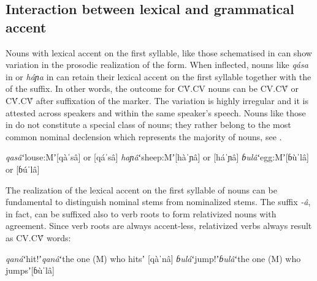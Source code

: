 \documentclass[output=paper]{LSP/langsci}
\begin{document}
\subsection{Interaction between lexical and grammatical accent} \label{sec:Petrollino:interaction}

Nouns with lexical accent on the first syllable, like those schematised in  can show variation in the prosodic realization of the  form. When inflected, nouns like \textit{qása} in  or \textit{háɲa} in  can retain their lexical accent on the first syllable together with the  of the  suffix. In other words, the outcome for CV́.CV nouns can be CV.CV̂ or CV́.CV̂ after suffixation of the   marker. The variation is highly irregular and it is attested across speakers and within the same speaker's speech. Nouns like those in  do not constitute a special class of nouns; they rather belong to the most common nominal declension which represents the majority of  nouns, see \citet[74]{Petrollino2016}. 
\begin{exe}
\ex \label{ex:Petrollino:irregular}\begin{xlist}
\ex \textit{qasâ}\hspace{16mm}ʻlouse:Mʼ\hspace{10mm}[qàˈsâ] or [qáˈsâ]
\ex \textit{haɲâ}\hspace{16mm}ʻsheep:Mʼ\hspace{9mm}[hàˈɲâ] or [háˈɲâ]
\ex \textit{ɓulâ}\hspace{17mm}ʻegg:Mʼ\hspace{13mm}[ɓùˈlâ] or [ɓúˈlâ]
\end{xlist}
\end{exe}
The realization of the lexical accent on the first syllable of  nouns can be fundamental to distinguish nominal stems from nominalized stems. The  suffix \textit{-â}, in fact, can be suffixed also to verb roots to form relativized nouns with  agreement. Since verb roots are always accent-less,  relativized verbs always result as CV.CV̂ words:
\begin{exe}
\ex \label{ex:Petrollino:relativized verbs} \begin{xlist}
\ex \textit{qaná}\hspace{15mm}ʻhit!ʼ\hspace{8mm}\textit{qanâ}\hspace{8mm}ʻthe one (M) who hitsʼ\hspace{5mm} [qàˈnâ]
\ex \textit{ɓulá}\hspace{16mm}ʻjump!ʼ\hspace{4mm}\textit{ɓulâ}\hspace{9mm}ʻthe one (M) who jumpsʼ\hspace{2mm}[ɓùˈlâ]
\end{xlist}
\end{exe}
\end{document}
